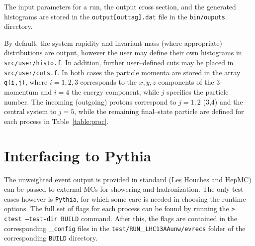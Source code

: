 \documentclass[12pt]{article}
\begin{document}
The input parameters for a run, the output cross section, and the generated histograms are stored in the \texttt{output[outtag].dat}
 file in the \texttt{bin/ouputs} directory. 

By default, the system rapidity and invariant mass (where appropriate) distributions are output, however the user may define their 
own histograms in \texttt{src/user/histo.f}. In addition, further user--defined cuts may be placed in \texttt{src/user/cuts.f}. In
 both cases the particle momenta are stored in the array \texttt{q(i,j)}, where $i=1,2,3$ corresponds to the $x,y,z$ components of 
 the 3--momentum and $i=4$ the energy component, while $j$ specifies the particle number. The incoming (outgoing) protons correspond 
 to $j=1,2$ (3,4) and the central system to $j=5$, while the remaining final--state particle are defined for each process in Table~\ref{table:proc}.

\section{Interfacing to Pythia}


The unweighted event output is provided in standard (Les Houches and HepMC) can be passed to external MCs for showering and 
hadronization. The only test cases however is \texttt{Pythia}, for which some care is needed in choosing the runtime options. The full set of flags for each process can be found by running the 
\newline
\newline
\texttt{>  ctest --test-dir BUILD}
\newline
\newline
command. After this, the flags are contained in the corresponding \_\texttt{config} files in the 
\newline
\newline
\texttt{test/RUN}\_\texttt{LHC13AAunw/evrecs}
\newline
\newline
folder of the corresponding \texttt{BUILD} directory.
\end{document}
